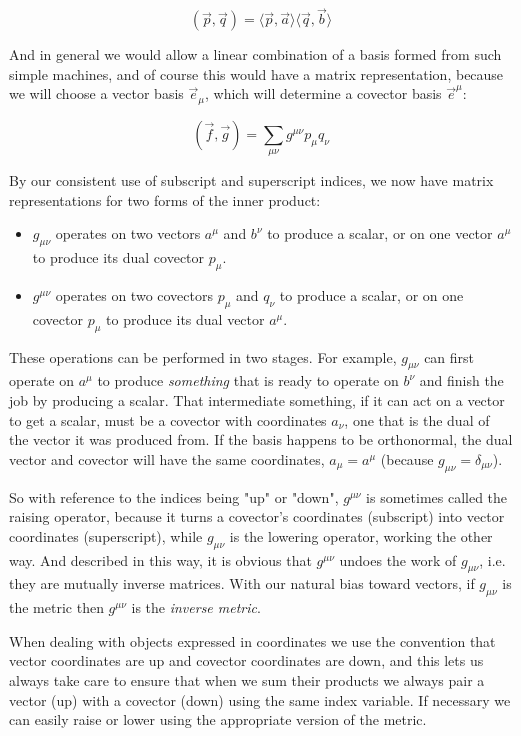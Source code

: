 $$
(\vec{p}, \vec{q}) =
\langle \vec{p}, \vec{a} \rangle
\langle \vec{q}, \vec{b} \rangle
$$

And in general we would allow a linear combination of a basis formed from such simple machines, and of course this would have a matrix representation, because we will choose a vector basis $\vec{e}_{\mu}$, which will determine a covector basis $\vec{e}^{\mu}$:

$$
(\vec{f},\vec{g}) = \sum_{\mu\nu} g^{\mu\nu} p_{\mu} q_{\nu} 
$$

By our consistent use of subscript and superscript indices, we now have matrix representations for two forms of the inner product:

\begin{itemize}
    \item $g_{\mu\nu}$ operates on two vectors $a^{\mu}$ and $b^{\nu}$ to produce a scalar, or on one vector $a^{\mu}$ to produce its dual covector $p_{\mu}$.
    \item $g^{\mu\nu}$ operates on two covectors $p_{\mu}$ and $q_{\nu}$ to produce a scalar, or on one covector $p_{\mu}$ to produce its dual vector $a^{\mu}$. 
\end{itemize}

These operations can be performed in two stages. For example, $g_{\mu\nu}$ can first operate on $a^{\mu}$ to produce \textit{something} that is ready to operate on $b^{\nu}$ and finish the job by producing a scalar. That intermediate something, if it can act on a vector to get a scalar, must be a covector with coordinates $a_{\nu}$, one that is the dual of the vector it was produced from. If the basis happens to be orthonormal, the dual vector and covector will have the same coordinates, $a_{\mu} = a^{\mu}$ (because $g_{\mu\nu} = \delta_{\mu\nu}$).

So with reference to the indices being "up" or "down", $g^{\mu\nu}$ is sometimes called the raising operator, because it turns a covector's coordinates (subscript) into vector coordinates (superscript), while $g_{\mu\nu}$ is the lowering operator, working the other way. And described in this way, it is obvious that $g^{\mu\nu}$ undoes the work of $g_{\mu\nu}$, i.e. they are mutually inverse matrices. With our natural bias toward vectors, if $g_{\mu\nu}$ is the metric then $g^{\mu\nu}$ is the \textit{inverse metric}.

When dealing with objects expressed in coordinates we use the convention that vector coordinates are up and covector coordinates are down, and this lets us always take care to ensure that when we sum their products we always pair a vector (up) with a covector (down) using the same index variable. If necessary we can easily raise or lower using the appropriate version of the metric.

